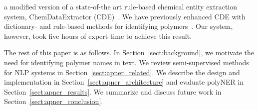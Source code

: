 a modified version of a state-of-the art rule-based chemical entity extraction
system, ChemDataExtractor (CDE)~\cite{swain2016chemdataextractor}.
We have previously enhanced CDE
with dictionary- and rule-based methods for identifying polymers~\cite{tchoua2017towards}.
Our system, however, took five hours of expert time to achieve this result.

The rest of this paper is as follows. 
In Section~\ref{sect:background}, we motivate the need for identifying polymer names in
text. 
We review semi-supervised methods for NLP systems in
Section~\ref{sect:apner_related}. 
We describe the design and implementation in Section~\ref{sect:apner_architecture} and evaluate polyNER
in Section~\ref{sect:apner_results}. We summarize and discuss future work in Section~\ref{sect:apner_conclusion}.





